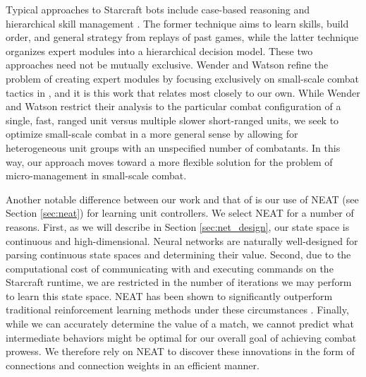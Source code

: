 \documentclass[10pt,a4paper,twocolumn]{article}
\begin{document}
Typical approaches to Starcraft bots include case-based reasoning \cite{weber2009case, weber2010case, cadena2011fuzzy} and hierarchical skill management \cite{mccoy2008integrated}. The former technique aims to learn skills, build order, and general strategy from replays of past games, while the latter technique organizes expert modules into a hierarchical decision model. These two approaches need not be mutually exclusive. Wender and Watson refine the problem of creating expert modules by focusing exclusively on small-scale combat tactics in \cite{rl_small_scale_combat}, and it is this work that relates most closely to our own. While Wender and Watson restrict their analysis to the particular combat configuration of a single, fast, ranged unit versus multiple slower short-ranged units, we seek to optimize small-scale combat in a more general sense by allowing for heterogeneous unit groups with an unspecified number of combatants. In this way, our approach moves toward a more flexible solution for the problem of micro-management in small-scale combat. 

Another notable difference between our work and that of \cite{rl_small_scale_combat} is our use of NEAT (see Section \ref{sec:neat}) for learning unit controllers. We select NEAT for a number of reasons. First, as we will describe in Section \ref{sec:net_design}, our state space is continuous and high-dimensional. Neural networks are naturally well-designed for parsing continuous state spaces and determining their value. Second, due to the computational cost of communicating with and executing commands on the Starcraft runtime, we are restricted in the number of iterations we may perform to learn this state space. NEAT has been shown to significantly outperform traditional reinforcement learning methods under these circumstances \cite{Stanley:2004:EEN:1048234}. Finally, while we can accurately determine the value of a match, we cannot predict what intermediate behaviors might be optimal for our overall goal of achieving combat prowess. We therefore rely on NEAT to discover these innovations in the form of connections and connection weights in an efficient manner.
\end{document}
